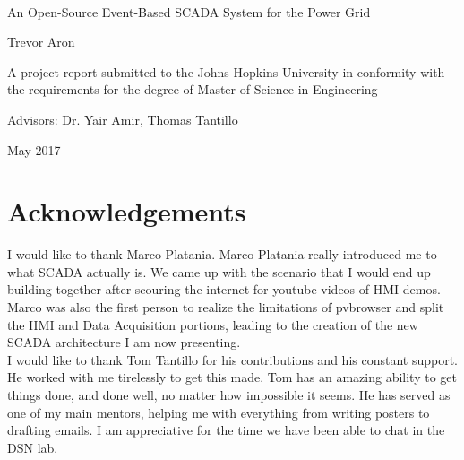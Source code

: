 \documentclass[oneside,11pt,a4paper,oldfontcommands]{book}
\begin{document}
%
%
\thispagestyle{empty}

{%
\sffamily
\centering
\Large
~\vspace{\fill}

{\huge 
An Open-Source Event-Based SCADA System for the Power Grid
}

\vspace{2.5cm}

{\LARGE
Trevor Aron
}

\vspace{3.5cm}

A project report submitted to the Johns Hopkins University in
conformity with the requirements for the degree of Master 
of Science in Engineering\\ 

\vspace{3.5cm}

Advisors: Dr. Yair Amir, Thomas Tantillo

\vspace{\fill}

May 2017

}%


\chapter*{Acknowledgements}

\indent \indent I would like to thank Marco Platania. Marco Platania really introduced me to
what SCADA actually is. We came up with the scenario that I would end up building
together after scouring the internet for youtube videos of HMI demos. Marco
was also the first person to realize the limitations of pvbrowser and split
the HMI and Data Acquisition portions, leading to the creation of the new SCADA 
architecture I am now presenting. \\

\indent I would like to thank Tom Tantillo for his contributions and 
his constant support.  He worked
with me tirelessly to get this made. Tom has an amazing ability to get things
done, and done well, no matter how impossible it seems.
He has served as one of my main mentors, helping me with everything from 
writing posters to drafting emails. I am appreciative for the time
we have been able to chat in the DSN lab. \\
\end{document}

